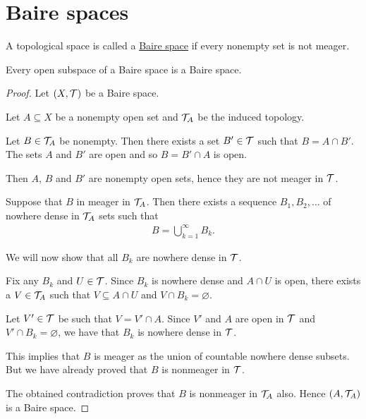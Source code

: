 \section{Baire spaces}\label{sec:baire_spaces}

\begin{definition}\label{def:baire_space}
  A topological space is called a \ul{Baire space} if every nonempty set is not meager.
\end{definition}

\begin{proposition}\label{thm:open_subspace_of_baire_space_is_baire}
  Every open subspace of a Baire space is a Baire space.
\end{proposition}
\begin{proof}
  Let $(X, \mathcal T)$ be a Baire space.

  Let $A \subseteq X$ be a nonempty open set and $\mathcal T_A$ be the induced topology.

  Let $B \in \mathcal T_A$ be nonempty. Then there exists a set $B' \in \mathcal T$ such that $B = A \cap B'$. The sets $A$ and $B'$ are open and so $B = B' \cap A$ is open.

  Then $A$, $B$ and $B'$ are nonempty open sets, hence they are not meager in $\mathcal T$.

  Suppose that $B$ in meager in $\mathcal T_A$. Then there exists a sequence $B_1, B_2, \ldots$ of nowhere dense in $\mathcal T_A$ sets such that
  \begin{align*}
    B = \bigcup_{k=1}^\infty B_k.
  \end{align*}

  We will now show that all $B_k$ are nowhere dense in $\mathcal T$.

  Fix any $B_k$ and $U \in \mathcal T$. Since $B_k$ is nowhere dense and $A \cap U$ is open, there exists a $V \in \mathcal T_A$ such that $V \subseteq A \cap U$ and $V \cap B_k = \varnothing$.

  Let $V' \in \mathcal T$ be such that $V = V' \cap A$. Since $V'$ and $A$ are open in $\mathcal T$ and $V' \cap B_k = \varnothing$, we have that $B_k$ is nowhere dense in $\mathcal T$.

  This implies that $B$ is meager as the union of countable nowhere dense subsets. But we have already proved that $B$ is nonmeager in $\mathcal T$.

  The obtained contradiction proves that $B$ is nonmeager in $\mathcal T_A$ also. Hence $(A, \mathcal T_A)$ is a Baire space.
\end{proof}
